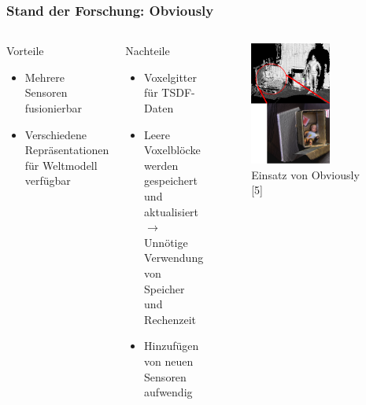     \begin{frame}[t]
    \frametitle{Stand der Forschung: Obviously}
      
      \begin{columns}[t]
      \column[]{7cm}
      \vspace{-0.5cm}
        \begin{exampleblock}{Vorteile}
	  \begin{itemize}
	    \item Mehrere Sensoren fusionierbar
	    \item Verschiedene Repräsentationen für Weltmodell verfügbar
	  \end{itemize} 
	\end{exampleblock}
	
	\begin{alertblock}{Nachteile}
	        \begin{itemize}
	\item Voxelgitter für TSDF-Daten
	\item Leere Voxelblöcke werden gespeichert und aktualisiert\\
	$\rightarrow$ Unnötige Verwendung von Speicher und Rechenzeit 
	\item Hinzufügen von neuen Sensoren aufwendig 
      \end{itemize} 
	\end{alertblock}
     
     \column{5cm}
      
       \begin{figure}[h]
       \vspace{-0.5cm}
 	\centering
 	    \includegraphics[width=0.65\textwidth]{images/obviosly_concat}
 	\caption{Einsatz von Obviously [5]} 
       \end{figure}
  
    \end{columns}
     
    \end{frame}
    
